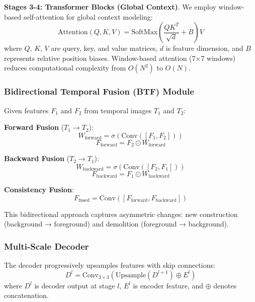 \documentclass[journal]{IEEEtran}
\begin{document}
\textbf{Stages 3-4: Transformer Blocks (Global Context)}. We employ window-based self-attention for global context modeling:
\begin{equation}
\text{Attention}(Q,K,V) = \text{SoftMax}\left(\frac{QK^T}{\sqrt{d}} + B\right)V
\end{equation}
where $Q$, $K$, $V$ are query, key, and value matrices, $d$ is feature dimension, and $B$ represents relative position biases. Window-based attention (7×7 windows) reduces computational complexity from $O(N^2)$ to $O(N)$.

\subsubsection{Bidirectional Temporal Fusion (BTF) Module}

Given features $F_1$ and $F_2$ from temporal images $T_1$ and $T_2$:

\textbf{Forward Fusion} ($T_1 \rightarrow T_2$):
\begin{equation}
W_{\text{forward}} = \sigma(\text{Conv}([F_1, F_2]))
\end{equation}
\begin{equation}
F_{\text{forward}} = F_2 \odot W_{\text{forward}}
\end{equation}

\textbf{Backward Fusion} ($T_2 \rightarrow T_1$):
\begin{equation}
W_{\text{backward}} = \sigma(\text{Conv}([F_2, F_1]))
\end{equation}
\begin{equation}
F_{\text{backward}} = F_1 \odot W_{\text{backward}}
\end{equation}

\textbf{Consistency Fusion}:
\begin{equation}
F_{\text{fused}} = \text{Conv}([F_{\text{forward}}, F_{\text{backward}}])
\end{equation}

This bidirectional approach captures asymmetric changes: new construction (background → foreground) and demolition (foreground → background).

\subsubsection{Multi-Scale Decoder}

The decoder progressively upsamples features with skip connections:
\begin{equation}
D^l = \text{Conv}_{3\times 3}(\text{Upsample}(D^{l+1}) \oplus E^l)
\end{equation}
where $D^l$ is decoder output at stage $l$, $E^l$ is encoder feature, and $\oplus$ denotes concatenation.
\end{document}
